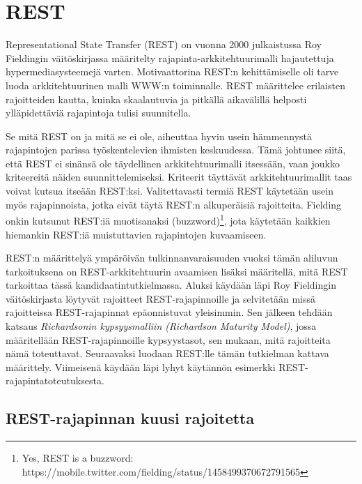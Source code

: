 
\section{REST}

Representational State Transfer (REST) on vuonna 2000 julkaistussa Roy Fieldingin väitöskirjassa määritelty rajapinta-arkkitehtuurimalli hajautettuja hypermediasysteemejä varten. Motivaattorina REST:n kehittämiselle oli tarve luoda arkkitehtuurinen malli WWW:n toiminnalle. REST määrittelee erilaisten rajoitteiden kautta, kuinka skaalautuvia ja pitkällä aikavälillä helposti ylläpidettäviä rajapintoja tulisi suunnitella. \cite{FieldingRThesisREST, FieldingRThesis}

Se mitä REST on ja mitä se ei ole, aiheuttaa hyvin usein hämmennystä rajapintojen parissa työskentelevien ihmisten keskuudessa. Tämä johtunee siitä, että REST ei sinänsä ole täydellinen arkkitehtuurimalli itsessään, vaan joukko kriteereitä näiden suunnittelemiseksi. Kriteerit täyttävät arkkitehtuurimallit taas voivat kutsua itseään REST:ksi. Valitettavasti termiä REST käytetään usein myös rajapinnoista, jotka eivät täytä REST:n alkuperäisiä rajoitteita. Fielding onkin kutsunut REST:iä muotisanaksi (buzzword)\footnote{Yes, REST is a buzzword:  https://mobile.twitter.com/fielding/status/1458499370672791565}, jota käytetään kaikkien hiemankin REST:iä muistuttavien rajapintojen kuvaamiseen. \cite{rest-apis-must-be-hypertext-driven}

REST:n määrittelyä ympäröivän tulkinnanvaraisuuden vuoksi tämän aliluvun tarkoituksena on REST-arkkitehtuurin avaamisen lisäksi määritellä, mitä REST tarkoittaa tässä kandidaatintutkielmassa. Aluksi käydään läpi Roy Fieldingin väitöskirjasta löytyvät rajoitteet REST-rajapinnoille ja selvitetään missä rajoitteissa REST-rajapinnat epäonnistuvat yleisimmin. Sen jälkeen tehdään katsaus \textit{Richardsonin kypsyysmalliin (Richardson Maturity Model)}, jossa määritellään REST-rajapinnoille kypsyystasot, sen mukaan, mitä rajoitteita nämä toteuttavat. Seuraavaksi luodaan REST:lle tämän tutkielman kattava määrittely. Viimeisenä käydään läpi lyhyt käytännön esimerkki REST-rajapintatoteutuksesta.

\subsection{REST-rajapinnan kuusi rajoitetta}
\label{REST-rajapinnan kuusi rajoitetta}

